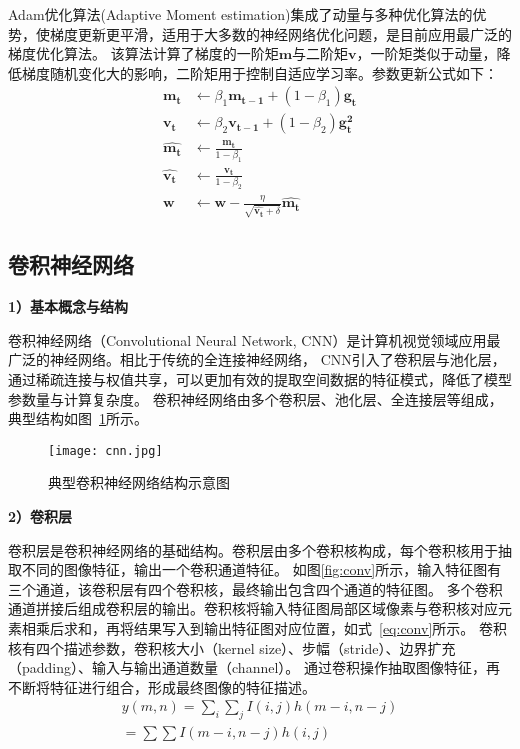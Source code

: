 Adam优化算法(Adaptive Moment estimation)\cite{kingma2020method}集成了动量与多种优化算法的优势，使梯度更新更平滑，适用于大多数的神经网络优化问题，是目前应用最广泛的梯度优化算法。
该算法计算了梯度的一阶矩$\boldsymbol{m}$与二阶矩$\boldsymbol{v}$，一阶矩类似于动量，降低梯度随机变化大的影响，二阶矩用于控制自适应学习率。参数更新公式如下：
\begin{equation}
  \begin{aligned}
    \boldsymbol{m_t}  & \leftarrow  \beta_1 \boldsymbol{m_{t-1}}  + (1 - \beta_1) \boldsymbol{g_t} \\
    \boldsymbol{v_t}  & \leftarrow  \beta_2 \boldsymbol{v_{t-1}}  + (1 - \beta_2) \boldsymbol{g_t^2} \\
    \boldsymbol{\hat{m_t}} &  \leftarrow \frac{\boldsymbol{m_t}}{1 - \beta_1} \\
    \boldsymbol{\hat{v_t}} &  \leftarrow \frac{\boldsymbol{v_t}}{1 - \beta_2} \\
    \boldsymbol{w}  & \leftarrow  \boldsymbol{w} - \frac{\eta}{\sqrt{\boldsymbol{\hat{v_t}} + \delta}} \boldsymbol{\hat{m_t}}
  \end{aligned}
  \label{eq:Adam}
\end{equation}




\subsection{卷积神经网络}

\textbf{1）基本概念与结构}

卷积神经网络（Convolutional Neural Network, CNN）\cite{li2021survey}是计算机视觉领域应用最广泛的神经网络。相比于传统的全连接神经网络，
CNN引入了卷积层与池化层，通过稀疏连接与权值共享，可以更加有效的提取空间数据的特征模式，降低了模型参数量与计算复杂度。
卷积神经网络由多个卷积层、池化层、全连接层等组成，典型结构如图~\ref{fig:cnn}所示。

\begin{figure}[htbp]
  \centering
  \texttt{[image: cnn.jpg]}
  \caption{典型卷积神经网络结构示意图}
  \label{fig:cnn}
\end{figure}

\textbf{2）卷积层}

卷积层是卷积神经网络的基础结构。卷积层由多个卷积核构成，每个卷积核用于抽取不同的图像特征，输出一个卷积通道特征。
如图\ref{fig:conv}所示，输入特征图有三个通道，该卷积层有四个卷积核，最终输出包含四个通道的特征图。
多个卷积通道拼接后组成卷积层的输出。卷积核将输入特征图局部区域像素与卷积核对应元素相乘后求和，再将结果写入到输出特征图对应位置，如式~\ref{eq:conv}所示。
卷积核有四个描述参数，卷积核大小（kernel size）、步幅（stride）、边界扩充（padding）、输入与输出通道数量（channel）。
通过卷积操作抽取图像特征，再不断将特征进行组合，形成最终图像的特征描述。
\begin{equation}
  \begin{array}{l}
    y(m, n)=\sum_{i} \sum_{j} I(i, j) h(m-i, n-j) \\
    =\sum \sum I(m-i, n-j) h(i, j)
    \end{array}
  \label{eq:conv}
\end{equation}

